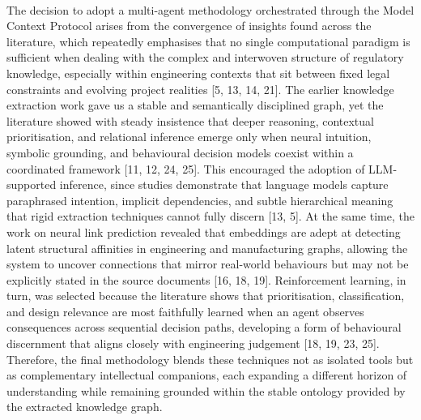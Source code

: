         \paragraph{}
        The decision to adopt a multi-agent methodology orchestrated through the Model Context Protocol arises from the convergence of insights found across the literature, which repeatedly emphasises that no single computational paradigm is sufficient when dealing with the complex and interwoven structure of regulatory knowledge, especially within engineering contexts that sit between fixed legal constraints and evolving project realities [5, 13, 14, 21]. The earlier knowledge extraction work gave us a stable and semantically disciplined graph, yet the literature showed with steady insistence that deeper reasoning, contextual prioritisation, and relational inference emerge only when neural intuition, symbolic grounding, and behavioural decision models coexist within a coordinated framework [11, 12, 24, 25]. This encouraged the adoption of LLM-supported inference, since studies demonstrate that language models capture paraphrased intention, implicit dependencies, and subtle hierarchical meaning that rigid extraction techniques cannot fully discern [13, 5]. At the same time, the work on neural link prediction revealed that embeddings are adept at detecting latent structural affinities in engineering and manufacturing graphs, allowing the system to uncover connections that mirror real-world behaviours but may not be explicitly stated in the source documents [16, 18, 19]. Reinforcement learning, in turn, was selected because the literature shows that prioritisation, classification, and design relevance are most faithfully learned when an agent observes consequences across sequential decision paths, developing a form of behavioural discernment that aligns closely with engineering judgement [18, 19, 23, 25]. Therefore, the final methodology blends these techniques not as isolated tools but as complementary intellectual companions, each expanding a different horizon of understanding while remaining grounded within the stable ontology provided by the extracted knowledge graph.

